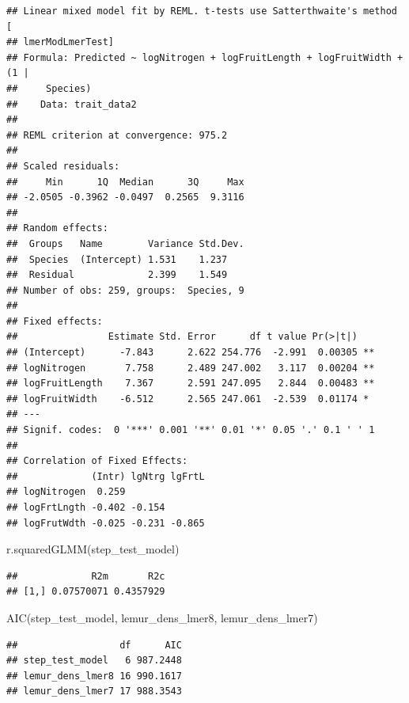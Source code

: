 \documentclass[
  12pt,
]{article}
\newenvironment{Shaded}{\begin{snugshade}}{\end{snugshade}}
\newcommand{\FunctionTok}[1]{\textcolor[rgb]{0.00,0.00,0.00}{#1}}
\newcommand{\NormalTok}[1]{#1}
\begin{document}
\begin{verbatim}
## Linear mixed model fit by REML. t-tests use Satterthwaite's method [
## lmerModLmerTest]
## Formula: Predicted ~ logNitrogen + logFruitLength + logFruitWidth + (1 |  
##     Species)
##    Data: trait_data2
## 
## REML criterion at convergence: 975.2
## 
## Scaled residuals: 
##     Min      1Q  Median      3Q     Max 
## -2.0505 -0.3962 -0.0497  0.2565  9.3116 
## 
## Random effects:
##  Groups   Name        Variance Std.Dev.
##  Species  (Intercept) 1.531    1.237   
##  Residual             2.399    1.549   
## Number of obs: 259, groups:  Species, 9
## 
## Fixed effects:
##                Estimate Std. Error      df t value Pr(>|t|)   
## (Intercept)      -7.843      2.622 254.776  -2.991  0.00305 **
## logNitrogen       7.758      2.489 247.002   3.117  0.00204 **
## logFruitLength    7.367      2.591 247.095   2.844  0.00483 **
## logFruitWidth    -6.512      2.565 247.061  -2.539  0.01174 * 
## ---
## Signif. codes:  0 '***' 0.001 '**' 0.01 '*' 0.05 '.' 0.1 ' ' 1
## 
## Correlation of Fixed Effects:
##             (Intr) lgNtrg lgFrtL
## logNitrogen  0.259              
## logFrtLngth -0.402 -0.154       
## logFrutWdth -0.025 -0.231 -0.865
\end{verbatim}

\begin{Shaded}
\begin{Highlighting}[]
\FunctionTok{r.squaredGLMM}\NormalTok{(step\_test\_model)}
\end{Highlighting}
\end{Shaded}

\begin{verbatim}
##             R2m       R2c
## [1,] 0.07570071 0.4357929
\end{verbatim}

\begin{Shaded}
\begin{Highlighting}[]
\FunctionTok{AIC}\NormalTok{(step\_test\_model, lemur\_dens\_lmer8, lemur\_dens\_lmer7)}
\end{Highlighting}
\end{Shaded}

\begin{verbatim}
##                  df      AIC
## step_test_model   6 987.2448
## lemur_dens_lmer8 16 990.1617
## lemur_dens_lmer7 17 988.3543
\end{verbatim}
\end{document}
